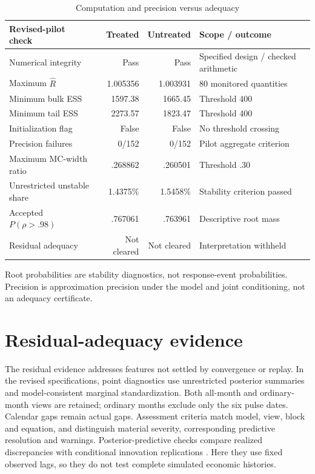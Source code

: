 \documentclass[11pt,a4paper]{article}
\begin{document}
\begin{table}[htbp]
\centering\small
\caption{Computation and precision versus adequacy}\label{tab:gates}
\begin{tabularx}{\textwidth}{@{}LrrP{.28\textwidth}@{}}
\toprule
Revised-pilot check & Treated & Untreated & Scope / outcome \\
\midrule
Numerical integrity & Pass & Pass & Specified design / checked arithmetic \\
Maximum $\widehat R$ & 1.005356 & 1.003931 & 80 monitored quantities \\
Minimum bulk ESS & 1597.38 & 1665.45 & Threshold 400 \\
Minimum tail ESS & 2273.57 & 1823.47 & Threshold 400 \\
Initialization flag & False & False & No threshold crossing \\
Precision failures & 0/152 & 0/152 & Pilot aggregate criterion \\
Maximum MC-width ratio & .268862 & .260501 & Threshold .30 \\
Unrestricted unstable share & 1.4375\% & 1.5458\% & Stability criterion passed \\
Accepted $P(\rho>.98)$ & .767061 & .763961 & Descriptive root mass \\
Residual adequacy & Not cleared & Not cleared & Interpretation withheld \\
\bottomrule
\end{tabularx}
\par\smallskip\footnotesize Root probabilities are stability diagnostics, not response-event probabilities. Precision is approximation precision under the model and joint conditioning, not an adequacy certificate.
\end{table}

\section{Residual-adequacy evidence}
The residual evidence addresses features not settled by convergence or replay. In the revised specifications, point diagnostics use unrestricted posterior summaries and model-consistent marginal standardization. Both all-month and ordinary-month views are retained; ordinary months exclude only the six pulse dates. Calendar gaps remain actual gaps. Assessment criteria match model, view, block and equation, and distinguish material severity, corresponding predictive resolution and warnings. Posterior-predictive checks compare realized discrepancies with conditional innovation replications \cite{gms1996}. Here they use fixed observed lags, so they do not test complete simulated economic histories.
\end{document}
